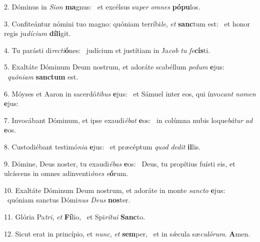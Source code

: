 2. Dóminus in \textit{Si}\textit{on} \textbf{ma}gnus: \ast\  et excélsus su\textit{per} \textit{om}\textit{nes} \textbf{pó}\textbf{pu}los.\

3. Confiteántur nómini tuo magno: quóniam terríbi\textit{le}, \textit{et} \textbf{sanc}tum est: \ast\  et honor regis ju\textit{dí}\textit{ci}\textit{um} \textbf{dí}\textbf{li}git.\

4. Tu parásti di\textit{rec}\textit{ti}\textbf{ó}nes: \ast\  judícium et justítiam in Ja\textit{cob} \textit{tu} \textit{fe}\textbf{cís}ti.\

5. Exaltáte Dóminum Deum nostrum, et adoráte scabéllum \textit{pe}\textit{dum} \textbf{e}jus: \ast\  \textit{quón}\textit{i}\textit{am} \textbf{sanc}\textbf{tum} est.\

6. Móyses et Aaron in sacerdó\textit{ti}\textit{bus} \textbf{e}jus: \ast\  et Sámuel inter eos, qui ínvo\textit{cant} \textit{no}\textit{men} \textbf{e}jus:\

7. Invocábant Dóminum, et ipse exaudi\textit{é}\textit{bat} \textbf{e}os: \ast\  in colúmna nubis loque\textit{bá}\textit{tur} \textit{ad} \textbf{e}os.\

8. Custodiébant testimó\textit{ni}\textit{a} \textbf{e}jus: \ast\  et præcéptum \textit{quod} \textit{de}\textit{dit} \textbf{il}lis.\

9. Dómine, Deus noster, tu exaudi\textit{é}\textit{bas} \textbf{e}os: \ast\  Deus, tu propítius fuísti eis, et ulcíscens in omnes adinventi\textit{ó}\textit{nes} \textit{e}\textbf{ó}rum.\

10. Exaltáte Dóminum Deum nostrum, et adoráte in monte \textit{sanc}\textit{to} \textbf{e}jus: \ast\  quóniam sanctus Dómi\textit{nus} \textit{De}\textit{us} \textbf{nos}ter.\

11. Glória Pa\textit{tri}, \textit{et} \textbf{Fí}lio, \ast\  et Spi\textit{rí}\textit{tu}\textit{i} \textbf{Sanc}to.\

12. Sicut erat in princípio, et \textit{nunc}, \textit{et} \textbf{sem}per, \ast\  et in sǽcula sæ\textit{cu}\textit{ló}\textit{rum}. \textbf{A}men.\

